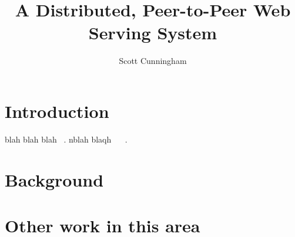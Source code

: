 \documentclass{article}
\title{A Distributed, Peer-to-Peer Web Serving System}
\begin{document}
\author{Scott Cunningham}
\maketitle{}


\section{Introduction}
%
blah blah blah ~\cite{blanchfield}. nblah blaqh ~\cite{levacher} ~\cite{freenet}.
%

\section{Background}
\section{Other work in this area}


\end{document}

